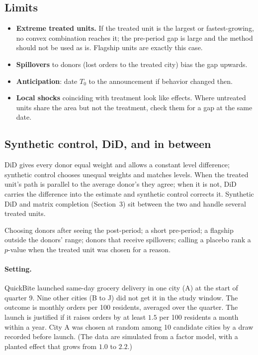 \documentclass[11pt]{article}
\begin{document}
\subsection{Limits}

\begin{itemize}
  \item \textbf{Extreme treated units.} If the treated unit is the largest or fastest-growing, no convex combination reaches it; the pre-period gap is
  large and the method should not be used as is. Flagship units are exactly this case.
  \item \textbf{Spillovers} to donors (lost orders to the treated city) bias the gap upwards.
  \item \textbf{Anticipation}: date $T_0$ to the announcement if behavior changed then.
  \item \textbf{Local shocks} coinciding with treatment look like effects. Where untreated units share the area but not the treatment, check them
  for a gap at the same date.
\end{itemize}

\subsection{Synthetic control, DiD, and in between}

DiD gives every donor equal weight and allows a constant level difference; synthetic control chooses unequal weights and matches levels. When
the treated unit's path is parallel to the average donor's they agree; when it is not, DiD carries the difference into the estimate and synthetic
control corrects it. Synthetic DiD and matrix completion (Section~3) sit between the two and handle several treated units.

\begin{pitfall}
Choosing donors after seeing the post-period; a short pre-period; a flagship outside the donors' range; donors that receive spillovers; calling a
placebo rank a $p$-value when the treated unit was chosen for a reason.
\end{pitfall}

\sectiontwo

\paragraph{Setting.} QuickBite launched same-day grocery delivery in one city (A) at the start of quarter 9. Nine other cities (B to J) did not get it in
the study window. The outcome is monthly orders per 100 residents, averaged over the quarter. The launch is justified if it raises orders by at least
$1.5$ per 100 residents a month within a year. City A was chosen at random among 10 candidate cities by a draw recorded before launch. (The data are
simulated from a factor model, with a planted effect that grows from $1.0$ to $2.2$.)
\end{document}
